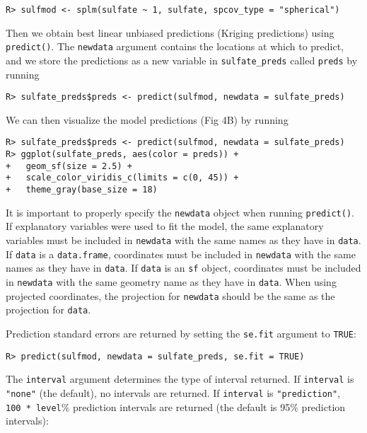 \documentclass[10pt,letterpaper]{article}
\begin{document}
\begin{verbatim}
R> sulfmod <- splm(sulfate ~ 1, sulfate, spcov_type = "spherical")
\end{verbatim}

Then we obtain best linear unbiased predictions (Kriging predictions)
using \texttt{predict()}. The \texttt{newdata} argument contains the
locations at which to predict, and we store the predictions as a new
variable in \texttt{sulfate\_preds} called \texttt{preds} by running

\begin{verbatim}
R> sulfate_preds$preds <- predict(sulfmod, newdata = sulfate_preds)
\end{verbatim}

We can then visualize the model predictions (Fig 4B) by running

\begin{verbatim}
R> sulfate_preds$preds <- predict(sulfmod, newdata = sulfate_preds)
R> ggplot(sulfate_preds, aes(color = preds)) +
+   geom_sf(size = 2.5) +
+   scale_color_viridis_c(limits = c(0, 45)) +
+   theme_gray(base_size = 18)
\end{verbatim}

It is important to properly specify the \texttt{newdata} object when
running \texttt{predict()}. If explanatory variables were used to fit
the model, the same explanatory variables must be included in
\texttt{newdata} with the same names as they have in \texttt{data}. If
\texttt{data} is a \texttt{data.frame}, coordinates must be included in
\texttt{newdata} with the same names as they have in \texttt{data}. If
\texttt{data} is an \texttt{sf} object, coordinates must be included in
\texttt{newdata} with the same geometry name as they have in
\texttt{data}. When using projected coordinates, the projection for
\texttt{newdata} should be the same as the projection for \texttt{data}.

Prediction standard errors are returned by setting the \texttt{se.fit}
argument to \texttt{TRUE}:

\begin{verbatim}
R> predict(sulfmod, newdata = sulfate_preds, se.fit = TRUE)
\end{verbatim}

The \texttt{interval} argument determines the type of interval returned.
If \texttt{interval} is \texttt{"none"} (the default), no intervals are
returned. If \texttt{interval} is \texttt{"prediction"},
\texttt{100\ *\ level}\% prediction intervals are returned (the default
is 95\% prediction intervals):
\end{document}
